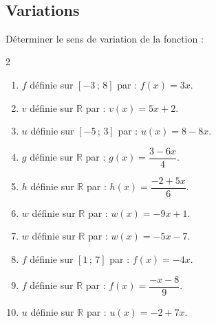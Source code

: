 {\begin{Exercice}
\begin{minipage}[c]{0.5\linewidth}
\begin{center}
\end{center}
\end{minipage}
\\

\end{Exercice}

\subsection*{Variations}


\begin{Exercice} %
Déterminer le sens de variation de la fonction :
\vspace{-0.5cm}
\begin{multicols}{2}
\begin{enumerate}
	\item $f$ définie sur $[-3\,;\,8]$ par : $f(x)=3x$.
	\item $v$ définie sur $\mathbb R$ par : $v(x)=5x+2$.
	\item $u$ définie sur $[-5\,;\,3]$ par : $u(x)=8-8x$.
	\item $g$ définie sur $\mathbb R$ par : $g(x)=\dfrac{3-6x}{4}$.
	\item $h$ définie sur $\mathbb R$ par : $h(x)=\dfrac{-2+5x}{6}$.
	\item $w$ définie sur $\mathbb R$ par : $w(x)=-9x+1$.
	\item $w$ définie sur $\mathbb R$ par : $w(x)=-5x-7$.
	\item $f$ définie sur $[1\,;\,7]$ par : $f(x)=-4x$.
	\item $f$ définie sur $\mathbb R$ par : $f(x)=\dfrac{-x-8}{9}$.
	\item $u$ définie sur $\mathbb R$ par : $u(x)=-2+7x$.
\end{enumerate}
\end{multicols}
\end{Exercice}

}

